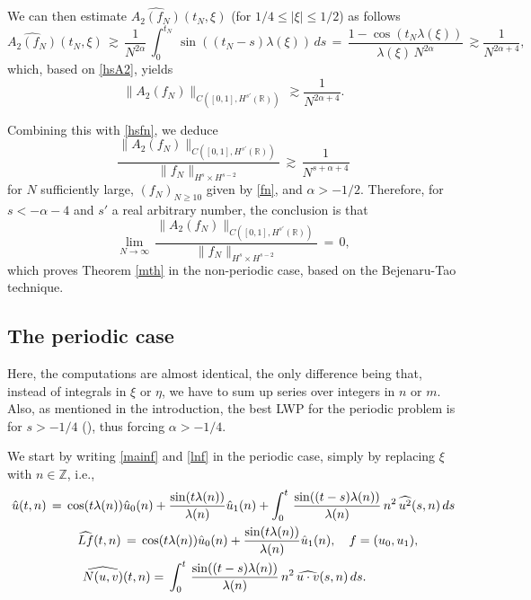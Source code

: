 \documentclass{amsart}
\begin{document}
We can then estimate $\widehat{A_2(f_N)}(t_N,\xi)$ (for $1/4\leq |\xi| \leq 1/2$) as follows
\[
\widehat{A_2(f_N)}(t_N,\xi)\,\gtrsim\,\frac{1}{N^{2\alpha}}\,\int_0^{t_N}\, \sin((t_N-s) \lambda(\xi))\,ds\,=\,\frac{1-\cos(t_N \lambda(\xi))}{\lambda(\xi)\,N^{2\alpha}}\,\gtrsim \frac{1}{N^{2\alpha+4}},\]
which, based on \eqref{hsA2}, yields
\begin{equation}
\|A_2(f_N)\|_{C([0,1], H^{s'}(\mathbb{R}))}\,\gtrsim \frac{1}{N^{2\alpha+4}}.
\end{equation}

Combining this with \eqref{hsfn}, we deduce 
\begin{equation}
\frac{\|A_2(f_N)\|_{C([0,1], H^{s'}(\mathbb{R}))}}{\|f_N\|_{H^s \times H^{s -2}}}\,\gtrsim\, \frac{1}{N^{s+\alpha+4}}
\end{equation}
for $N$ sufficiently large, $(f_N)_{N\geq 10}$ given by \eqref{fn}, and $\alpha>-1/2$. Therefore, for $s<-\alpha-4$ and $s'$ a real arbitrary number, the conclusion is that
\begin{equation}
\lim_{N\to\infty}\,\frac{\|A_2(f_N)\|_{C([0,1], H^{s'}(\mathbb{R}))}}{\|f_N\|_{H^s \times H^{s -2}}}\,=\,0,
\end{equation}
which proves Theorem \ref{mth} in the non-periodic case, based on the Bejenaru-Tao technique.

\subsection{The periodic case} Here, the computations are almost identical, the only difference being that, instead of integrals in $\xi$ or $\eta$, we have to sum up series over integers in $n$ or $m$. Also, as mentioned in the introduction, the best LWP for the periodic problem is for $s>-1/4$ (\cite{FS10}), thus forcing $\alpha>-1/4$. 

We start by writing \eqref{mainf} and \eqref{lnf} in the periodic case, simply by replacing $\xi$ with $n\in\mathbb{Z}$, i.e.,
\begin{equation}
\aligned
\hat{u}(t,n)\,=\,\cos(t \lambda(n))& \hat{u}_0(n)+\frac{\sin(t \lambda(n))}{\lambda(n)} \hat{u}_1(n)+\int_0^t\,\frac{\sin((t-s) \lambda(n))}{\lambda(n)}\, n^2\, \widehat{u^2}(s,n)\,ds\\
\widehat{Lf}(t,n)\,&=\,\cos(t \lambda(n)) \hat{u}_0(n)+\frac{\sin(t \lambda(n))}{\lambda(n)} \hat{u}_1(n),\quad f=(u_0,u_1),\\
\widehat{N(u,v)}&(t,n)=\,\int_0^t\,\frac{\sin((t-s) \lambda(n))}{\lambda(n)}\, n^2\, \widehat{u\cdot v}(s,n)\,ds.\endaligned
\end{equation}
\end{document}
